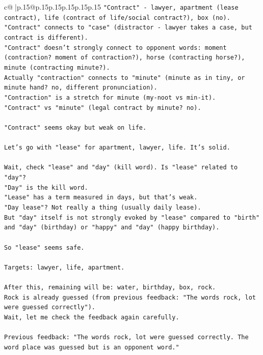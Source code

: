 \documentclass{article}
\begin{document}
{\begin{supertabular}{c@{$\;$}|p{.15\linewidth}@{}p{.15\linewidth}p{.15\linewidth}p{.15\linewidth}p{.15\linewidth}p{.15\linewidth}}
{{{\texttt{"Contract" {-} lawyer, apartment (lease contract), life (contract of life/social contract?), box (no).} \\
\texttt{"Contract" connects to "case" (distractor {-} lawyer takes a case, but contract is different).} \\
\texttt{"Contract" doesn't strongly connect to opponent words: moment (contraction? moment of contraction?), horse (contracting horse?), minute (contracting minute?).} \\
\texttt{Actually "contraction" connects to "minute" (minute as in tiny, or minute hand? no, different pronunciation).} \\
\texttt{"Contraction" is a stretch for minute (my{-}noot vs min{-}it).} \\
\texttt{"Contract" vs "minute" (legal contract by minute? no).} \\
\\ 
\texttt{"Contract" seems okay but weak on life.} \\
\\ 
\texttt{Let's go with "lease" for apartment, lawyer, life. It's solid.} \\
\\ 
\texttt{Wait, check "lease" and "day" (kill word). Is "lease" related to "day"?} \\
\texttt{"Day" is the kill word.} \\
\texttt{"Lease" has a term measured in days, but that's weak.} \\
\texttt{"Day lease"? Not really a thing (usually daily lease).} \\
\texttt{But "day" itself is not strongly evoked by "lease" compared to "birth" and "day" (birthday) or "happy" and "day" (happy birthday).} \\
\\ 
\texttt{So "lease" seems safe.} \\
\\ 
\texttt{Targets: lawyer, life, apartment.} \\
\\ 
\texttt{After this, remaining will be: water, birthday, box, rock.} \\
\texttt{Rock is already guessed (from previous feedback: "The words rock, lot were guessed correctly").} \\
\texttt{Wait, let me check the feedback again carefully.} \\
\\ 
\texttt{Previous feedback: "The words rock, lot were guessed correctly. The word place was guessed but is an opponent word."} \\
}}}
\end{supertabular}}
\end{document}
